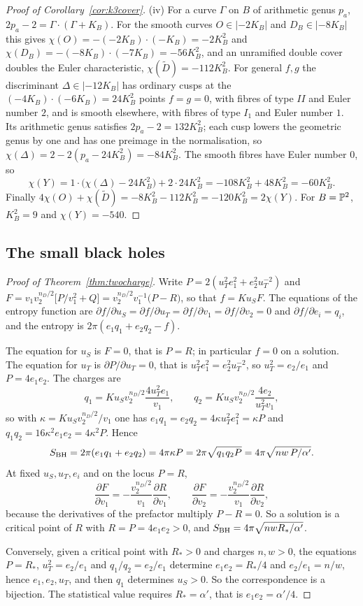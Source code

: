 \begin{proof}[Proof of Corollary~\ref{cor:k3cover}]
(iv) For a curve $\Gamma$ on $B$ of arithmetic genus $p_a$, $2p_a-2=\Gamma\cdot(\Gamma+K_B)$. For the smooth curves $O\in|{-2K_B}|$ and $D_B\in|{-8K_B}|$ this gives $\chi(O)=-(-2K_B)\cdot(-K_B)=-2K_B^2$ and $\chi(D_B)=-(-8K_B)\cdot(-7K_B)=-56K_B^2$, and an unramified double cover doubles the Euler characteristic, $\chi(\widetilde D)=-112K_B^2$. For general $f,g$ the discriminant $\Delta\in|{-12K_B}|$ has ordinary cusps at the $(-4K_B)\cdot(-6K_B)=24K_B^2$ points $f=g=0$, with fibres of type $II$ and Euler number $2$, and is smooth elsewhere, with fibres of type $I_1$ and Euler number $1$. Its arithmetic genus satisfies $2p_a-2=132K_B^2$; each cusp lowers the geometric genus by one and has one preimage in the normalisation, so $\chi(\Delta)=2-2(p_a-24K_B^2)=-84K_B^2$. The smooth fibres have Euler number $0$, so
\[
\chi(Y)=1\cdot\big(\chi(\Delta)-24K_B^2\big)+2\cdot24K_B^2=-108K_B^2+48K_B^2=-60K_B^2.
\]
Finally $4\chi(O)+\chi(\widetilde D)=-8K_B^2-112K_B^2=-120K_B^2=2\chi(Y)$. For $B=\mathbb{P}^2$, $K_B^2=9$ and $\chi(Y)=-540$.
\end{proof}

\subsection{The small black holes}

\begin{proof}[Proof of Theorem~\ref{thm:twocharge}]
Write $P=2(u_T^2e_1^2+e_2^2u_T^{-2})$ and $F=v_1v_2^{n_D/2}\big[P/v_1^2+Q\big]=v_2^{n_D/2}v_1^{-1}\big(P-R\big)$, so that $f=Ku_SF$. The equations of the entropy function \cite[Section~3]{Prester06} are $\partial f/\partial u_S=\partial f/\partial u_T=\partial f/\partial v_1=\partial f/\partial v_2=0$ and $\partial f/\partial e_i=q_i$, and the entropy is $2\pi(e_1q_1+e_2q_2-f)$.

The equation for $u_S$ is $F=0$, that is $P=R$; in particular $f=0$ on a solution. The equation for $u_T$ is $\partial P/\partial u_T=0$, that is $u_T^2e_1^2=e_2^2u_T^{-2}$, so $u_T^2=e_2/e_1$ and $P=4e_1e_2$. The charges are
\[
q_1=Ku_Sv_2^{n_D/2}\frac{4u_T^2e_1}{v_1},\qquad q_2=Ku_Sv_2^{n_D/2}\frac{4e_2}{u_T^2v_1},
\]
so with $\kappa=Ku_Sv_2^{n_D/2}/v_1$ one has $e_1q_1=e_2q_2=4\kappa u_T^2e_1^2=\kappa P$ and $q_1q_2=16\kappa^2e_1e_2=4\kappa^2P$. Hence
\[
S_{\rm BH}=2\pi(e_1q_1+e_2q_2)=4\pi\kappa P=2\pi\sqrt{q_1q_2P}=4\pi\sqrt{nw\,P/\alpha'}.
\]
At fixed $u_S,u_T,e_i$ and on the locus $P=R$,
\[
\frac{\partial F}{\partial v_1}=-\frac{v_2^{n_D/2}}{v_1}\frac{\partial R}{\partial v_1},\qquad\frac{\partial F}{\partial v_2}=-\frac{v_2^{n_D/2}}{v_1}\frac{\partial R}{\partial v_2},
\]
because the derivatives of the prefactor multiply $P-R=0$. So a solution is a critical point of $R$ with $R=P=4e_1e_2>0$, and $S_{\rm BH}=4\pi\sqrt{nwR_*/\alpha'}$.

Conversely, given a critical point with $R_*>0$ and charges $n,w>0$, the equations $P=R_*$, $u_T^2=e_2/e_1$ and $q_1/q_2=e_2/e_1$ determine $e_1e_2=R_*/4$ and $e_2/e_1=n/w$, hence $e_1,e_2,u_T$, and then $q_1$ determines $u_S>0$. So the correspondence is a bijection. The statistical value requires $R_*=\alpha'$, that is $e_1e_2=\alpha'/4$.
\end{proof}

